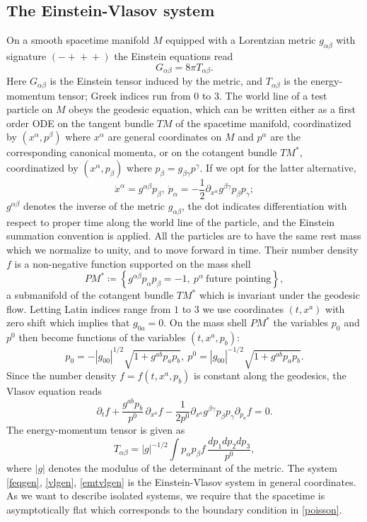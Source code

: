 \documentclass[11pt]{article}
\begin{document}
\subsection{The Einstein-Vlasov system}
\label{ss_ev}
On a smooth spacetime manifold $M$
equipped with a  Lorentzian metric $g_{\alpha \beta}$
with signature $(-{}+{}+{}+)$
the Einstein equations read
\begin{equation} \label{feqgen}
  G_{\alpha \beta} = 8 \pi T_{\alpha \beta}.
\end{equation}
Here $G_{\alpha \beta}$ is the Einstein tensor induced by the metric, and
$T_{\alpha \beta}$ is the energy-momentum tensor; Greek indices run from
$0$ to $3$.
The world line of a test particle
on $M$ obeys the geodesic equation,
which can be written either as a first order ODE on the tangent bundle
$TM$ of the spacetime manifold, coordinatized by $(x^\alpha, p^\beta)$
where $x^\alpha$ are general coordinates on $M$ and
$p^\alpha$ are the corresponding canonical momenta,
or on the cotangent bundle
$TM^\ast$, coordinatized by $(x^\alpha, p_\beta)$
where $p_\beta= g_{\beta\gamma} p^\gamma$. If we opt for the latter alternative,
\[
\dot x^\alpha = g^{\alpha\beta} p_\beta,\
\dot p_\alpha = - \frac{1}{2}\partial_{x^\alpha} g^{\beta \gamma} p_\beta p_\gamma;
\]
$g^{\alpha \beta}$ denotes the inverse of the metric $g_{\alpha \beta}$,
the dot indicates differentiation with respect to proper time along the
world line of the particle, and the Einstein summation convention is applied.
All the particles are to have the same
rest mass which we normalize to unity, and to move forward in time.
Their number density $f$ is a non-negative function
supported on the mass shell
\[
PM^\ast \coloneqq \left\{ g^{\alpha \beta} p_\alpha p_\beta = -1,\ p^\alpha \
\mbox{future pointing} \right\},
\]
a submanifold of the cotangent bundle $TM^\ast$
which is invariant under the geodesic flow.
Letting Latin indices range from $1$ to $3$
we use coordinates $(t,x^a)$ with zero shift which implies that
$g_{0a}=0$. On the mass shell $PM^\ast$ the variables $p_0$ and $p^0$
then become functions of the variables $(t,x^a,p_b)$:
\[
p_0 = - |g_{00}|^{1/2} \sqrt{1+g^{ab}p_a p_b},\
p^0 =  |g_{00}|^{-1/2}  \sqrt{1+g^{ab}p_a p_b}.
\]
Since the number density
$f=f(t,x^a,p_b)$ is constant along the geodesics,
the Vlasov equation reads
\begin{equation} \label{vlgen}
  \partial_t f + \frac{g^{a b} p_b}{p^0}\,\partial_{x^a} f
  -\frac{1}{2 p^0} \partial_{x^a} g^{\beta \gamma} p_\beta p_\gamma \partial_{p_a} f
  = 0.
\end{equation}
The energy-momentum tensor is given as
\begin{equation} \label{emtvlgen}
  T_{\alpha \beta}
  = |g|^{-1/2}\int p_\alpha p_\beta f\,\frac{dp_1 dp_2 dp_3}{p^0},
\end{equation}
where $|g|$ denotes the modulus of the determinant of the metric.
The system \eqref{feqgen}, \eqref{vlgen}, \eqref{emtvlgen}
is the Einstein-Vlasov system in general coordinates. As we
want to describe isolated systems, we require that the
spacetime is asymptotically flat which corresponds to the boundary condition
in \eqref{poisson}.
\end{document}
